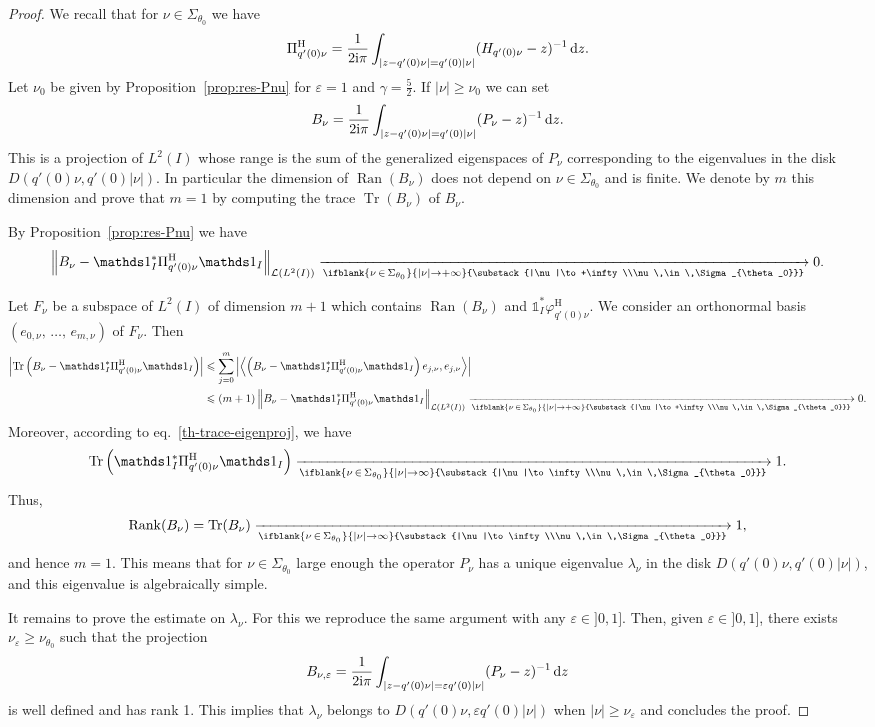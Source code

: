 \documentclass[AHL,Unicode,longabstracts,published]{cedram}
\newcommand{\abs}[1]{\left\vert #1\right\vert}
\newcommand{\nr}[1]{\left\Vert #1\right\Vert}
\newcommand{\innp}[2]{\left \langle #1, #2 \right \rangle}
\renewcommand{\leq}{\leqslant}
\renewcommand{\geq}{\geqslant}
\newcommand{\inv}{^{-1}}
\newcommand{\1}{\mathds 1}
\newcommand{\limt}[3][]{\xrightarrow[\ifblank{#1}{#2 \to #3}{\substack{#2\to #3\\#1}}]{}}
\DeclareMathOperator{\Rank}{Rank}
\DeclareMathOperator{\Ran}{Ran}
\DeclareMathOperator{\Tr}{Tr}
\newcommand{\Lc}{{\mathcal L}}
\newcommand{\diff}[1][-3]{\ensuremath{\mathop{}\mkern#1mu\mathrm{d}}}
\newcommand{\iu}{\mathrm i}
\newcommand{\sector}[1][\theta_0]{\Sigma_{#1}}
\newcommand{\h}{{\mathrm{H}}}
\newcommand{\g}{\gamma}
\newcommand{\e}{\varepsilon}
\renewcommand{\l}{\lambda}
\newcommand{\f}{\varphi}
\begin{document}
\begin{proof}
We recall that for $\nu \in \sector$ we have
\[
\Pi^\h_{q'(0) \nu} = \frac 1 {2\iu\pi} \int_{\abs{z - q'(0) \nu} = q'(0)|\nu|} (H_{q'(0)\nu}-z)\inv \diff z.
\]
Let $\nu_0$ be given by Proposition~\ref{prop:res-Pnu} for $\e = 1$ and $\g = \frac 52$. If $\abs \nu \geq \nu_0$ we can set
\[
B_\nu = \frac 1 {2\iu\pi} \int_{\abs{z - q'(0) \nu} = q'(0)|\nu|} (P_\nu-z)\inv \diff z.
\]
This is a projection of $L^2(I)$ whose range is the sum of the generalized eigenspaces of $P_\nu$ corresponding to the eigenvalues in the disk $D(q'(0) \nu, q'(0)\abs \nu)$. In particular the dimension of $\Ran(B_\nu)$ does not depend on $\nu \in \Sigma_{\theta_0}$ and is finite. We denote by $m$ this dimension and prove that $m=1$ by computing the trace $\Tr(B_\nu)$ of $B_\nu$.

By Proposition~\ref{prop:res-Pnu} we have
\[
\left\| B_\nu - \1_I^* \Pi^\h_{q'(0) \nu} \1_I \right\|_{\Lc\left(L^2(I)\right)} \limt[\nu\,\in\,\sector]{|\nu|}{+\infty} 0.
\]

Let $F_\nu$ be a subspace of $L^2(I)$ of dimension $m+1$ which contains $\Ran(B_\nu)$ and $\1_I^* \f_{q'(0)\nu}^\h$. We consider an orthonormal basis $(e_{0,\nu},\,\dots,\,e_{m,\nu})$ of $F_\nu$. Then
\begin{align*}
\abs{\Tr\left(B_\nu - \1_I^* \Pi^\h_{q'(0) \nu} \1_I \right)} &\leq \sum_{j=0}^m \abs{\innp{\left(B_\nu - \1_I^* \Pi^\h_{q'(0) \nu} \1_I \right)e_{j,\nu}}{e_{j,\nu}}}\\
&\leq (m+1) \nr{B_\nu - \1_I^* \Pi^\h_{q'(0) \nu} \1_I}_{\Lc(L^2(I))}
\limt[\nu\,\in\,\sector]{|\nu|}{+\infty} 0.
\end{align*}
Moreover, according to eq.~\eqref{th-trace-eigenproj}, we have
\begin{equation*}
\Tr\left(\1_I^* \Pi^\h_{q'(0) \nu} \1_I\right) \limt[\nu\,\in\,\sector]{|\nu|}{\infty} 1.
\end{equation*}
Thus,
\[
\Rank(B_\nu) = \Tr(B_\nu) \limt[\nu\,\in\,\sector]{|\nu|}{\infty} 1,
\]
and hence $m = 1$. This means that for $\nu \in \Sigma_{\theta_0}$ large enough the operator $P_\nu$ has a unique eigenvalue $\l_\nu$ in the disk $D(q'(0)\nu,q'(0)\abs \nu)$, and this eigenvalue is algebraically simple.

It remains to prove the estimate on $\l_\nu$. For this we reproduce the same argument with any $\e \in]0,1]$. Then, given $\e \in]0,1]$, there exists $\nu_\e \geq \nu_{\theta_0}$ such that the projection
\[
B_{\nu,\e} = \frac 1 {2\iu \pi} \int_{\abs{z - q'(0) \nu} = \e q'(0) |\nu|} (P_\nu-z)\inv \diff z
\]
is well defined and has rank 1. This implies that $\l_\nu$ belongs to $D(q'(0)\nu, \e q'(0) \abs\nu)$ when $\abs \nu \geq \nu_\e$ and concludes the proof.
\end{proof}
\end{document}
